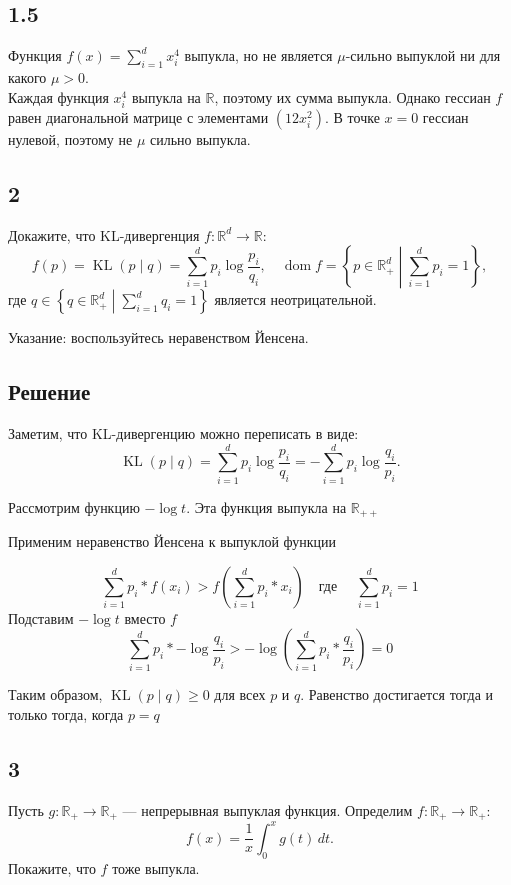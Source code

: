 \documentclass{article}
\DeclareMathOperator{\dom}{dom}
\DeclareMathOperator{\KL}{KL}
\begin{document}
\subsection*{1.5}
Функция \( f(x) = \sum_{i=1}^d x_i^4 \) выпукла, но не является $\mu$-сильно выпуклой ни для какого $\mu > 0$. \\

Каждая функция $x_i^4$ выпукла на $\mathbb{R}$, поэтому их сумма выпукла. Однако гессиан $f$ равен диагональной матрице с элементами $(12x_i^2)$. В точке $x = 0$ гессиан нулевой, поэтому не  $\mu$ сильно выпукла.


\subsection*{2} Докажите, что KL-дивергенция \( f : \mathbb{R}^d \to \mathbb{R} \):
\[
f(p) = \KL(p \mid q) = \sum_{i=1}^d p_i \log \frac{p_i}{q_i}, \quad \dom f = \left\{ p \in \mathbb{R}_+^d \middle| \sum_{i=1}^d p_i = 1 \right\},
\]
где \( q \in \left\{ q \in \mathbb{R}_+^d \middle| \sum_{i=1}^d q_i = 1 \right\} \) является неотрицательной.

Указание: воспользуйтесь неравенством Йенсена.

\subsection*{Решение}

Заметим, что KL-дивергенцию можно переписать в виде:
$$
\KL(p \mid q) = \sum_{i=1}^d p_i \log \frac{p_i}{q_i} = -\sum_{i=1}^d p_i \log \frac{q_i}{p_i}.
$$

Рассмотрим функцию  $-\log t $. Эта функция выпукла на  $\mathbb{R}_{++} $

Применим неравенство Йенсена к выпуклой функции


$$
\sum_{i=1}^d p_i * f(x_i) > f ( \sum_{i=1}^d p_i * x_i )\quad \text{где } \quad \sum_{i=1}^d p_i = 1
$$
Подставим $-\log t$ вместо $f$
$$
\sum_{i=1}^d p_i * -\log \frac{q_i}{p_i} > -\log  ( \sum_{i=1}^d p_i * \frac{q_i}{p_i} ) = 0
$$

Таким образом, $\KL(p \mid q) \geq 0$  для всех  $p$ и $q$. Равенство достигается тогда и только тогда, когда $ p = q $


\subsection*{3} Пусть \( g : \mathbb{R}_+ \to \mathbb{R}_+ \) — непрерывная выпуклая функция. Определим \( f : \mathbb{R}_+ \to \mathbb{R}_+ \):
\[
f(x) = \frac{1}{x} \int_0^x g(t) \, dt.
\]
Покажите, что \( f \) тоже выпукла.
\end{document}
